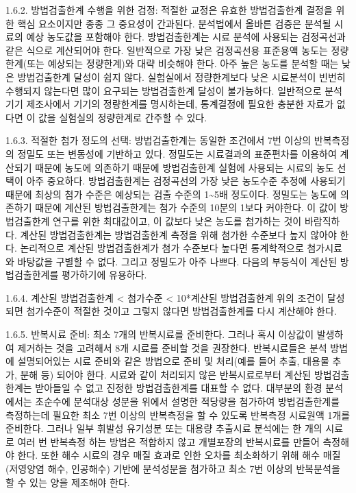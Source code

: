 \documentclass[
]{book}
\begin{document}
1.6.2. 방법검출한계 수행을 위한 검정: 적절한 교정은 유효한 방법검출한계 결정을 위한 핵심 요소이지만 종종 그 중요성이 간과된다. 분석법에서 올바른 검증은 분석될 시료의 예상 농도값을 포함해야 한다. 방법검출한계는 시료 분석에 사용되는 검정곡선과 같은 식으로 계산되어야 한다. 일반적으로 가장 낮은 검정곡선용 표준용액 농도는 정량한계(또는 예상되는 정량한계)와 대략 비슷해야 한다. 아주 높은 농도를 분석할 때는 낮은 방법검출한계 달성이 쉽지 않다. 실험실에서 정량한계보다 낮은 시료분석이 빈번히 수행되지 않는다면 많이 요구되는 방법검출한계 달성이 불가능하다. 일반적으로 분석기기 제조사에서 기기의 정량한계를 명시하는데, 통계결정에 필요한 충분한 자료가 없다면 이 값을 실험실의 정량한계로 간주할 수 있다.

1.6.3. 적절한 첨가 정도의 선택: 방법검출한계는 동일한 조건에서 7번 이상의 반복측정의 정밀도 또는 변동성에 기반하고 있다. 정밀도는 시료결과의 표준편차를 이용하여 계산되기 때문에 농도에 의존하기 때문에 방법검출한계 실험에 사용되는 시료의 농도 선택이 아주 중요하다. 방법검출한계는 검정곡선의 가장 낮은 농도수준 추정에 사용되기 때문에 최상의 첨가 수준은 예상되는 검출 수준의 1\textasciitilde5배 정도이다. 정밀도는 농도에 의존하기 때문에 계산된 방법검출한계는 첨가 수준의 10분의 1보다 커야한다. 이 값이 방법검출한계 연구를 위한 최대값이고, 이 값보다 낮은 농도를 첨가하는 것이 바람직하다. 계산된 방법검출한계는 방법검출한계 측정을 위해 첨가한 수준보다 높지 않아야 한다. 논리적으로 계산된 방법검출한계가 첨가 수준보다 높다면 통계학적으로 첨가시료와 바탕값을 구별할 수 없다. 그리고 정밀도가 아주 나쁘다. 다음의 부등식이 계산된 방법검출한계를 평가하기에 유용하다.

1.6.4. 계산된 방법검출한계 \textless{} 첨가수준 \textless{} 10*계산된 방법검출한계
위의 조건이 달성되면 첨가수준이 적절한 것이고 그렇지 않다면 방법검출한계를 다시 계산해야 한다.

1.6.5. 반복시료 준비: 최소 7개의 반복시료를 준비한다. 그러나 혹시 이상값이 발생하여 제거하는 것을 고려해서 8개 시료를 준비할 것을 권장한다. 반복시료들은 분석 방법에 설명되어있는 시료 준비와 같은 방법으로 준비 및 처리(예를 들어 추출, 대용물 추가, 분해 등) 되어야 한다. 시료와 같이 처리되지 않은 반복시료로부터 계산된 방법검출한계는 받아들일 수 없고 진정한 방법검출한계를 대표할 수 없다. 대부분의 환경 분석에서는 초순수에 분석대상 성분을 위에서 설명한 적당량을 첨가하여 방법검출한계를 측정하는데 필요한 최소 7번 이상의 반복측정을 할 수 있도록 반복측정 시료원액 1개를 준비한다. 그러나 일부 휘발성 유기성분 또는 대용량 추출시료 분석에는 한 개의 시료로 여러 번 반복측정 하는 방법은 적합하지 않고 개별포장의 반복시료를 만들어 측정해야 한다. 또한 해수 시료의 경우 매질 효과로 인한 오차를 최소화하기 위해 해수 매질(저영양염 해수, 인공해수) 기반에 분석성분을 첨가하고 최소 7번 이상의 반복분석을 할 수 있는 양을 제조해야 한다.
\end{document}
